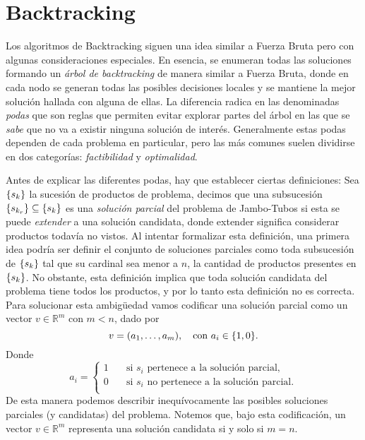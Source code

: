 \documentclass{article}
\DeclarePairedDelimiter\curl{\{}{\}}
\newcommand{\Rn}[1]{\mathbb{R}^{#1}}
\begin{document}
\section{Backtracking} \label{sec:backtracking}
Los algoritmos de Backtracking siguen una idea similar a Fuerza Bruta pero con algunas consideraciones especiales. En esencia, se enumeran todas las soluciones formando un \emph{árbol de backtracking} de manera similar a Fuerza Bruta, donde en cada nodo se generan todas las posibles decisiones locales y se mantiene la mejor solución hallada con alguna de ellas. La diferencia radica en las denominadas \emph{podas} que son reglas que permiten evitar explorar partes del árbol en las que se \emph{sabe} que no va a existir ninguna solución de interés. Generalmente estas podas dependen de cada problema en particular, pero las más comunes suelen dividirse en dos categorías: \emph{factibilidad} y \emph{optimalidad}.

Antes de explicar las diferentes podas, hay que establecer ciertas definiciones: Sea $\curl{s_{k}}$ la sucesión de productos de problema, decimos que una subsucesión $\curl{s_{k_{r}}} \subseteq \curl{s_{k}}$ es una \emph{solución parcial} del problema de Jambo-Tubos si esta se puede \emph{extender} a una solución candidata, donde extender significa considerar productos todavía no vistos. Al intentar formalizar esta definición, una primera idea podría ser definir el conjunto de soluciones parciales como toda subsucesión de $\curl{s_{k}}$ tal que su cardinal sea menor a $n$, la cantidad de productos presentes en $\curl{s_{k}}$. No obstante, esta definición implica que toda solución candidata del problema tiene todos los productos, y por lo tanto esta definición no es correcta. Para solucionar esta ambigüedad vamos codificar una solución parcial como un vector $v \in \Rn{m}$ con $m < n$, dado por
\[
    v = (a_{1}, \hdots, a_{m}), \quad \text{con } a_{i} \in \curl{1, 0}.
\]
Donde
\[
    a_{i} = \begin{cases}
        1 \quad &\text{si $s_{i}$ pertenece a la solución parcial,} \\
        0 \quad &\text{si $s_{i}$ no pertenece a la solución parcial.} \\
    \end{cases}
\]
De esta manera podemos describir inequívocamente las posibles soluciones parciales (y candidatas) del problema. Notemos que, bajo esta codificación, un vector $v\in\Rn{m}$ representa una solución candidata si y solo si $m = n$.
\end{document}
